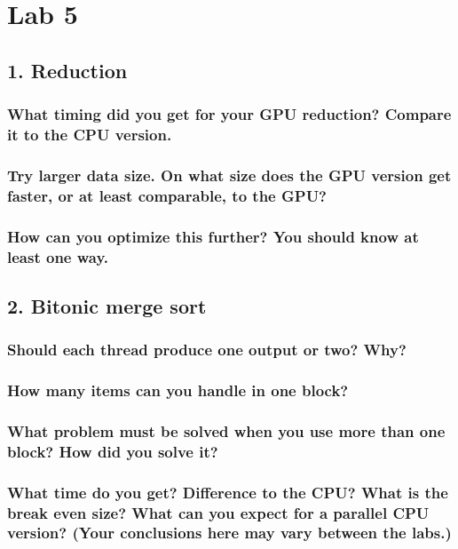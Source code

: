 \documentclass[a4paper,12pt]{article}
\begin{document}
\section{Lab 5}

\subsection{1. Reduction}

\subsubsection{What timing did you get for your GPU reduction? Compare it to the CPU version.}


\subsubsection{Try larger data size. On what size does the GPU version get faster, or at least comparable, to the GPU?}


\subsubsection{How can you optimize this further? You should know at least one way.}




\subsection{2. Bitonic merge sort}

\subsubsection{Should each thread produce one output or two? Why?}


\subsubsection{How many items can you handle in one block?}


\subsubsection{What problem must be solved when you use more than one block? How did you solve it?}


\subsubsection{What time do you get? Difference to the CPU? What is the break even size? What can you expect for a parallel CPU version? (Your conclusions here may vary between the labs.)}
\end{document}
